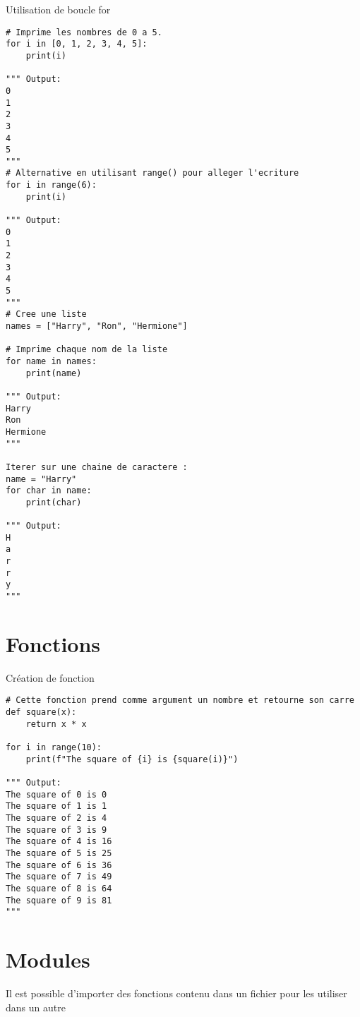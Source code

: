 \documentclass{report}
\begin{document}
\begin{EExample*}{Utilisation de boucle for}{}
\begin{lstlisting}[style=PythonDraculaWhite]
# Imprime les nombres de 0 a 5. 
for i in [0, 1, 2, 3, 4, 5]:
    print(i)

""" Output:
0
1
2
3
4
5
"""
# Alternative en utilisant range() pour alleger l'ecriture
for i in range(6):
    print(i)

""" Output:
0
1
2
3
4
5
"""
# Cree une liste
names = ["Harry", "Ron", "Hermione"]

# Imprime chaque nom de la liste
for name in names:
    print(name)

""" Output:
Harry
Ron
Hermione
"""

Iterer sur une chaine de caractere :
name = "Harry"
for char in name:
    print(char)

""" Output:
H
a
r
r
y
"""
\end{lstlisting}
\end{EExample*}

\section{Fonctions}
\begin{EExample*}{Création de fonction}{}
\begin{lstlisting}[style=PythonDraculaWhite]
# Cette fonction prend comme argument un nombre et retourne son carre
def square(x):
    return x * x

for i in range(10):
    print(f"The square of {i} is {square(i)}")

""" Output:
The square of 0 is 0
The square of 1 is 1
The square of 2 is 4
The square of 3 is 9
The square of 4 is 16
The square of 5 is 25
The square of 6 is 36
The square of 7 is 49
The square of 8 is 64
The square of 9 is 81
"""
\end{lstlisting}
\end{EExample*}

\section{Modules}
\begin{note}
Il est possible d'importer des fonctions contenu dans un fichier pour les utiliser dans un autre
\end{note}
\end{document}
